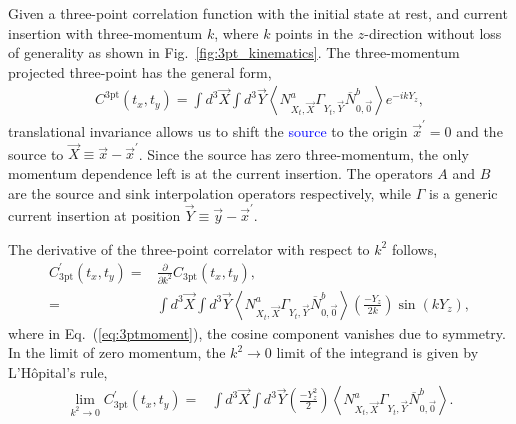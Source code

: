 \documentclass{PoS}
\newcommand{\kno}[1]{\textcolor{blue}{#1}}
\begin{document}
Given a three-point correlation function with the initial state at rest, and current insertion with three-momentum $k$, where $k$ points in the $z$-direction without loss of generality as shown in Fig.~\ref{fig:3pt_kinematics}. The three-momentum projected three-point has the general form,
\begin{align}
C^{\text{3pt}}(t_x, t_y) = \int d^3\vec{X} \int d^3\vec{Y} \left<N^a_{X_t,\vec{X}}\Gamma_{Y_t,\vec{Y}} \overline{N}^b_{0,\vec{0}}\right> e^{-ikY_z},
\label{eq:3pt}
\end{align}
translational invariance allows us to shift the \kno{source} to the origin $\vec{x}^\prime = 0$ and the source to $\vec{X}\equiv \vec{x} - \vec{x}^\prime$. Since the source has zero three-momentum, the only momentum dependence left is at the current insertion. The operators $A$ and $B$ are the source and sink interpolation operators respectively, while $\Gamma$ is a generic current insertion at position $\vec{Y}\equiv \vec{y}-\vec{x}^\prime$.

The derivative of the three-point correlator with respect to $k^2$ follows,
\begin{align}
C^\prime_{\text{3pt}}(t_x, t_y) = &\frac{\partial}{\partial k^2}C_{\text{3pt}}(t_x, t_y),\nonumber\\
=& \int d^3\vec{X} \int d^3\vec{Y} \left<N^a_{X_t,\vec{X}}\Gamma_{Y_t,\vec{Y}} \overline{N}^b_{0,\vec{0}}\right> \left(\frac{-Y_z}{2k}\right)\sin\left(kY_z\right),
\label{eq:3ptmoment}
\end{align}
where in Eq.~(\ref{eq:3ptmoment}), the cosine component vanishes due to symmetry. %
In the limit of zero momentum, the $k^2 \rightarrow 0$ limit of the integrand is given by L'H\^opital's rule,
\begin{align}
\lim_{k^2 \rightarrow 0} C^\prime_{\text{3pt}}(t_x, t_y) = & \int d^3\vec{X} \int d^3\vec{Y}\left(\frac{-Y_z^2}{2}\right)\left<N^a_{X_t,\vec{X}}\Gamma_{Y_t,\vec{Y}} \overline{N}^b_{0,\vec{0}}\right>.
\label{eq:3ptmoment0}
\end{align}

\end{document}

